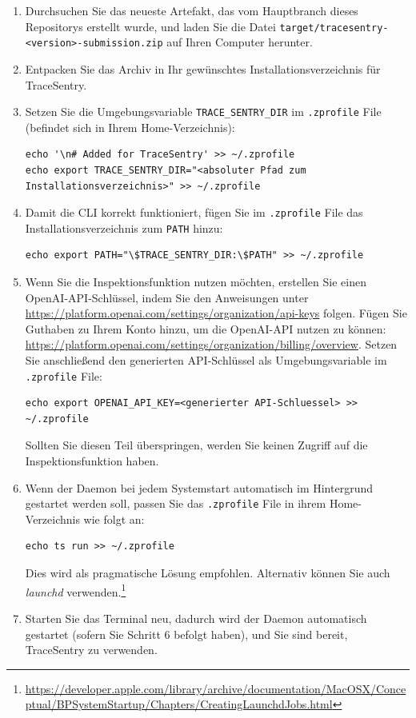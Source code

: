 \documentclass[a4paper,12pt]{report}
\begin{document}
    \begin{enumerate}
        \item Durchsuchen Sie das neueste Artefakt, das vom Hauptbranch dieses Repositorys erstellt wurde, und laden Sie die Datei
        \texttt{target/tracesentry-\textless{}version\textgreater{}-submission.zip} auf Ihren Computer herunter.
        \item Entpacken Sie das Archiv in Ihr gewünschtes Installationsverzeichnis für TraceSentry.
        \item Setzen Sie die Umgebungsvariable \texttt{TRACE\_SENTRY\_DIR} im \texttt{.zprofile} File (befindet sich in Ihrem Home-Verzeichnis):
        \begin{lstlisting}[label={lst:lstlisting-mac-1}]
echo '\n# Added for TraceSentry' >> ~/.zprofile
echo export TRACE_SENTRY_DIR="<absoluter Pfad zum Installationsverzeichnis>" >> ~/.zprofile
        \end{lstlisting}
        \item Damit die CLI korrekt funktioniert, fügen Sie im \texttt{.zprofile} File das Installationsverzeichnis zum \texttt{PATH} hinzu:
        \begin{lstlisting}[label={lst:lstlisting-mac-2}]
echo export PATH="\$TRACE_SENTRY_DIR:\$PATH" >> ~/.zprofile
        \end{lstlisting}
        \item Wenn Sie die Inspektionsfunktion nutzen möchten, erstellen Sie einen OpenAI-API-Schlüssel, indem Sie den Anweisungen unter \url{https://platform.openai.com/settings/organization/api-keys} folgen.
        Fügen Sie Guthaben zu Ihrem Konto hinzu, um die OpenAI-API nutzen zu können: \url{https://platform.openai.com/settings/organization/billing/overview}.
        Setzen Sie anschließend den generierten API-Schlüssel als Umgebungsvariable im \texttt{.zprofile} File:
        \begin{lstlisting}[label={lst:lstlisting-mac-3}]
echo export OPENAI_API_KEY=<generierter API-Schluessel> >> ~/.zprofile
        \end{lstlisting}
        Sollten Sie diesen Teil überspringen, werden Sie keinen Zugriff auf die Inspektionsfunktion haben.
        \item Wenn der Daemon bei jedem Systemstart automatisch im Hintergrund gestartet werden soll, passen Sie das \texttt{.zprofile} File in ihrem Home-Verzeichnis wie folgt an:
        \begin{lstlisting}[label={lst:lstlisting-mac-4}]
echo ts run >> ~/.zprofile
        \end{lstlisting}
        Dies wird als pragmatische Lösung empfohlen.
        Alternativ können Sie auch \textit{launchd} verwenden.\footnote{\url{https://developer.apple.com/library/archive/documentation/MacOSX/Conceptual/BPSystemStartup/Chapters/CreatingLaunchdJobs.html}}
        \item Starten Sie das Terminal neu, dadurch wird der Daemon automatisch gestartet (sofern Sie Schritt 6 befolgt haben), und Sie sind bereit, TraceSentry zu verwenden.
    \end{enumerate}
\end{document}
